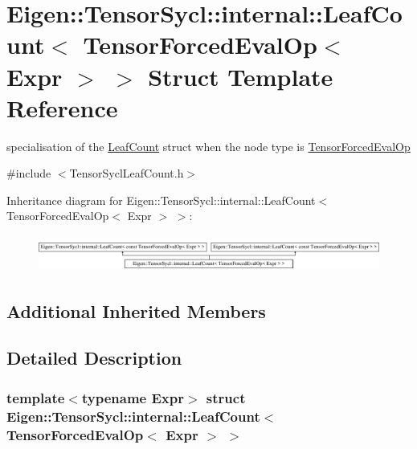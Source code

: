 \hypertarget{struct_eigen_1_1_tensor_sycl_1_1internal_1_1_leaf_count_3_01_tensor_forced_eval_op_3_01_expr_01_4_01_4}{}\section{Eigen\+:\+:Tensor\+Sycl\+:\+:internal\+:\+:Leaf\+Count$<$ Tensor\+Forced\+Eval\+Op$<$ Expr $>$ $>$ Struct Template Reference}
\label{struct_eigen_1_1_tensor_sycl_1_1internal_1_1_leaf_count_3_01_tensor_forced_eval_op_3_01_expr_01_4_01_4}


specialisation of the \hyperlink{struct_eigen_1_1_tensor_sycl_1_1internal_1_1_leaf_count}{Leaf\+Count} struct when the node type is \hyperlink{class_eigen_1_1_tensor_forced_eval_op}{Tensor\+Forced\+Eval\+Op}  




{\ttfamily \#include $<$Tensor\+Sycl\+Leaf\+Count.\+h$>$}

Inheritance diagram for Eigen\+:\+:Tensor\+Sycl\+:\+:internal\+:\+:Leaf\+Count$<$ Tensor\+Forced\+Eval\+Op$<$ Expr $>$ $>$\+:\begin{figure}[H]
\begin{center}
\leavevmode
\includegraphics[height=1.204301cm]{struct_eigen_1_1_tensor_sycl_1_1internal_1_1_leaf_count_3_01_tensor_forced_eval_op_3_01_expr_01_4_01_4}
\end{center}
\end{figure}
\subsection*{Additional Inherited Members}


\subsection{Detailed Description}
\subsubsection*{template$<$typename Expr$>$\newline
struct Eigen\+::\+Tensor\+Sycl\+::internal\+::\+Leaf\+Count$<$ Tensor\+Forced\+Eval\+Op$<$ Expr $>$ $>$}

